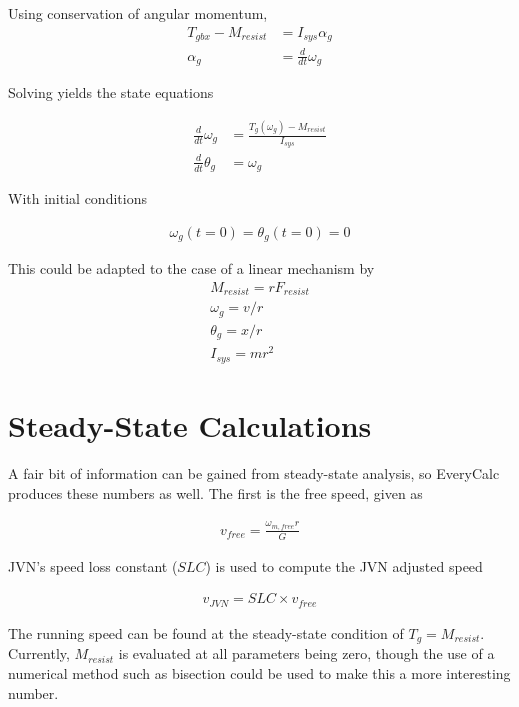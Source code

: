 \documentclass[10pt,letterpaper]{article}
\begin{document}
	Using conservation of angular momentum,
	\begin{align}
		T_{gbx} - M_{resist} &= I_{sys} \alpha_{g} \\
		\alpha_{g} &= \frac{d}{dt} \omega_{g}
	\end{align}

	Solving yields the state equations

	\begin{align}
		\frac{d}{dt} \omega_{g} &= \frac{T_{g}(\omega_{g}) - M_{resist}}{I_{sys}} \\
		\frac{d}{dt} \theta_{g} &= \omega_{g}
	\end{align}

	With initial conditions

	\begin{align}
		\omega_g(t=0) = \theta_g(t=0) = 0 
	\end{align}

	This could be adapted to the case of a linear mechanism by
	\begin{align}
		M_{resist} = r F_{resist} \\
		\omega_g   = v / r \\
		\theta_g   = x / r \\
		I_{sys}    = m r^2
	\end{align}

	\section*{Steady-State Calculations}
	A fair bit of information can be gained from steady-state analysis, so EveryCalc produces these numbers as well. The first is the free speed, given as

	\begin{align}
		v_{free} = \frac{\omega_{m,free} r}{G}
	\end{align}

	JVN's speed loss constant ($SLC$) is used to compute the JVN adjusted speed

	\begin{align}
		v_{JVN} = SLC \times v_{free}
	\end{align}

	The running speed can be found at the steady-state condition of $T_g = M_{resist}$. Currently, $M_{resist}$ is evaluated at all parameters being zero, though the use of a numerical method such as bisection could be used to make this a more interesting number.
\end{document}
